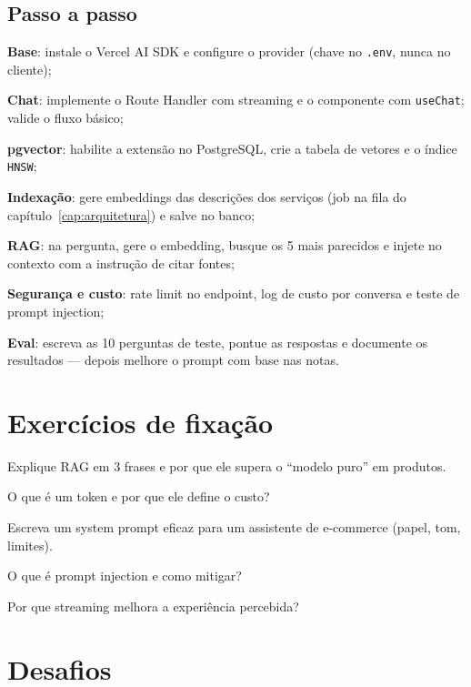 \subsection{Passo a passo}

\begin{passos}
  \item \textbf{Base}: instale o Vercel AI SDK e configure o provider (chave
  no \texttt{.env}, nunca no cliente);
  \item \textbf{Chat}: implemente o Route Handler com streaming e o
  componente com \texttt{useChat}; valide o fluxo básico;
  \item \textbf{pgvector}: habilite a extensão no PostgreSQL, crie a tabela de
  vetores e o índice \texttt{HNSW};
  \item \textbf{Indexação}: gere embeddings das descrições dos serviços (job
  na fila do capítulo~\ref{cap:arquitetura}) e salve no banco;
  \item \textbf{RAG}: na pergunta, gere o embedding, busque os 5 mais
  parecidos e injete no contexto com a instrução de citar fontes;
  \item \textbf{Segurança e custo}: rate limit no endpoint, log de custo por
  conversa e teste de prompt injection;
  \item \textbf{Eval}: escreva as 10 perguntas de teste, pontue as respostas e
  documente os resultados — depois melhore o prompt com base nas notas.
\end{passos}

\section{Exercícios de fixação}

\begin{exercicios}
  \item Explique RAG em 3 frases e por que ele supera o ``modelo puro'' em produtos.
  \item O que é um token e por que ele define o custo?
  \item Escreva um system prompt eficaz para um assistente de e-commerce (papel, tom, limites).
  \item O que é prompt injection e como mitigar?
  \item Por que streaming melhora a experiência percebida?
\end{exercicios}

\section{Desafios}

